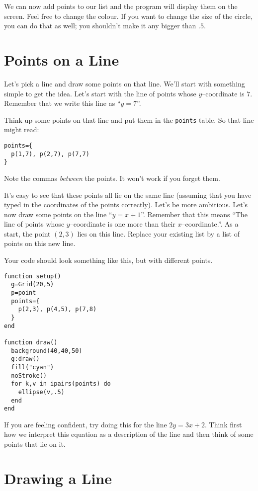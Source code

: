 \documentclass[
  xhtml,%
  use filename%
]{internet}
\begin{document}
We can now add points to our list and the program will display them on the screen.
Feel free to change the colour.
If you want to change the size of the circle, you can do that as well; you shouldn't make it any bigger than \(.5\).

\section{Points on a Line}

Let's pick a line and draw some points on that line.
We'll start with something simple to get the idea.
Let's start with the line of points whose \(y\)--coordinate is \(7\).
Remember that we write this line as ``\(y = 7\)''.

Think up some points on that line and put them in the \verb+points+ table.
So that line might read:

\begin{verbatim}
points={
  p(1,7), p(2,7), p(7,7)
}
\end{verbatim}

Note the commas \emph{between} the points.
It won't work if you forget them.

It's easy to see that these points all lie on the same line (assuming that you have typed in the coordinates of the points correctly).
Let's be more ambitious.
Let's now draw some points on the line ``\(y = x + 1\)''.
Remember that this means ``The line of points whose \(y\)--coordinate is one more than their \(x\)--coordinate.''.
As a start, the point \((2,3)\) lies on this line.
Replace your existing list by a list of points on this new line.

Your code should look something like this, but with different points.

\begin{verbatim}
function setup()
  g=Grid(20,5)
  p=point
  points={
    p(2,3), p(4,5), p(7,8)
  }
end

function draw()
  background(40,40,50)
  g:draw()
  fill("cyan")
  noStroke()
  for k,v in ipairs(points) do
    ellipse(v,.5)
  end
end
\end{verbatim}

If you are feeling confident, try doing this for the line \(2 y = 3 x + 2\).
Think first how we interpret this equation as a description of the line and then think of some points that lie on it.

\section{Drawing a Line}
\end{document}
